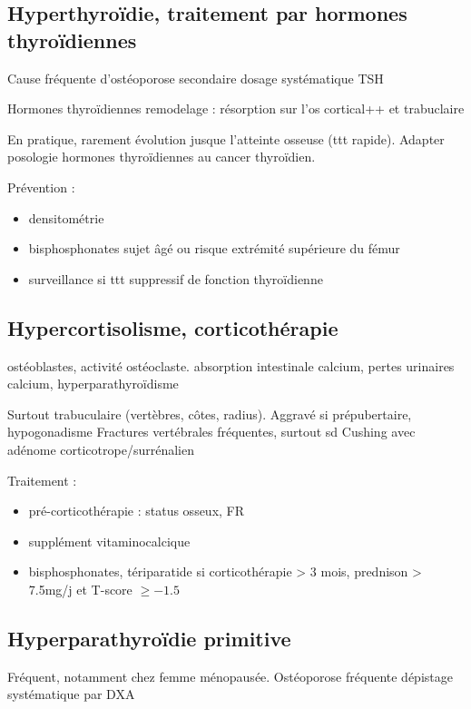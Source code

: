 \documentclass[11pt]{article}
\begin{document}
\subsection{Hyperthyroïdie, traitement par hormones thyroïdiennes}
\label{sec:org70855d6}
Cause fréquente d'ostéoporose secondaire \thus dosage systématique TSH

Hormones thyroïdiennes \inc remodelage : résorption sur l'os cortical++ et trabuclaire

En pratique, rarement évolution jusque l'atteinte osseuse (ttt
rapide). Adapter posologie hormones thyroïdiennes au cancer thyroïdien.

Prévention :
\begin{itemize}
\item densitométrie
\item bisphosphonates sujet âgé ou risque extrémité supérieure du fémur
\item surveillance si ttt suppressif de fonction thyroïdienne
\end{itemize}

\subsection{Hypercortisolisme, corticothérapie}
\label{sec:org770b6de}

\dec ostéoblastes, \inc activité ostéoclaste. \dec absorption intestinale
calcium, \inc pertes urinaires calcium, hyperparathyroïdisme

Surtout trabuculaire (vertèbres, côtes, radius). Aggravé si prépubertaire, hypogonadisme
Fractures vertébrales fréquentes, surtout sd Cushing avec adénome
corticotrope/surrénalien

Traitement : 
\begin{itemize}
\item pré-corticothérapie : status osseux, FR
\item supplément vitaminocalcique
\item bisphosphonates, tériparatide si corticothérapie > 3 mois, prednison > 7.5mg/j
et T-score \(\ge -1.5\)
\end{itemize}

\subsection{Hyperparathyroïdie primitive}
\label{sec:org20865c9}
Fréquent, notamment chez femme ménopausée. Ostéoporose fréquente \thus dépistage
systématique par DXA
\end{document}
